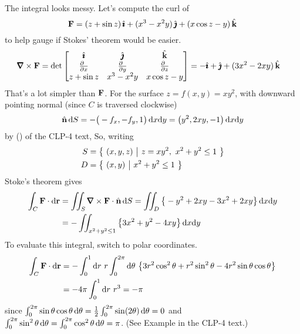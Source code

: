\begin{solution}
The integral looks messy. Let's compute the curl of
\begin{equation*}
\mathbf{F} = (z + \sin z) \,\hat{\pmb{\imath}} 
      + (x^3 - x^2 y) \,\hat{\pmb{\jmath}}
      + (x \cos z - y) \,\hat{\mathbf{k}}
\end{equation*} 
to help gauge if Stokes' theorem would be easier.
\begin{align*}
\vnabla\times\vF
&=\det\left[\begin{matrix}
\hi &\hj &\hk \\
\tfrac{\partial\hfill}{\partial x} & \tfrac{\partial\hfill}{\partial y} & 
                \tfrac{\partial\hfill}{\partial z} \\
z + \sin z & x^3 - x^2 y & x \cos z - y
\end{matrix}
\right]
=-\hi +\hj +(3x^2-2xy)\,\hk
\end{align*}
That's a lot simpler than $\mathbf{F}$.
For the surface $z=f(x,y)=xy^2$, with downward pointing normal (since $C$ is traversed clockwise)
\begin{equation*}
\hat{\mathbf{n}}\,\mathrm{d}S = -\big(-f_x,-f_y,1\big)\,\mathrm{d}x\mathrm{d}y
=\big(y^2,2xy,-1\big)\,\mathrm{d}x\mathrm{d}y
\end{equation*}
by () of the CLP-4 text,
So, writing
\begin{align*}
   S&=\big\{ \ (x,y,z)\ \big|\ z=xy^2,\ x^2+y^2\le 1\ \big\} \\
   D&=\big\{ \ (x,y)\ \big|\ x^2+y^2\le 1\ \big\}
\end{align*} 
Stoke's theorem gives
\begin{align*}
\int_C\vF\cdot\dee{\vr}
&=\dblInt_S \vnabla\times\vF\cdot\hn\,\dee{S}
=\dblInt_D\big\{-y^2+2xy -3x^2+2xy\big\}\,\dee{x}\dee{y} \\
&=-\dblInt_{x^2+y^2\le 1}\big\{3x^2+y^2-4xy\big\}\,\dee{x}\dee{y}
\end{align*}
To evaluate this integral, switch to polar coordinates.
\begin{align*}
\int_C\vF\cdot\dee{\vr}
&=-\int_0^1\dee{r}\ r\int_0^{2\pi}\dee{\theta}\ 
           \big\{3r^2\cos^2\theta+r^2\sin^2\theta
              -4r^2\sin\theta\cos\theta\big\} \\
&=-4\pi \int_0^1\dee{r}\ r^3 =-\pi
\end{align*}
since 
$\int_0^{2\pi}\sin\theta\cos\theta\,\mathrm{d}\theta
 =\frac{1}{2}\int_0^{2\pi}\sin(2\theta)\,\mathrm{d}\theta=0$
and
$\int_0^{2\pi}\sin^2\theta\,\mathrm{d}\theta
        =\int_0^{2\pi}\cos^2\theta\,\mathrm{d}\theta
        =\pi$.
(See Example  in the CLP-4 text.)
\end{solution}

